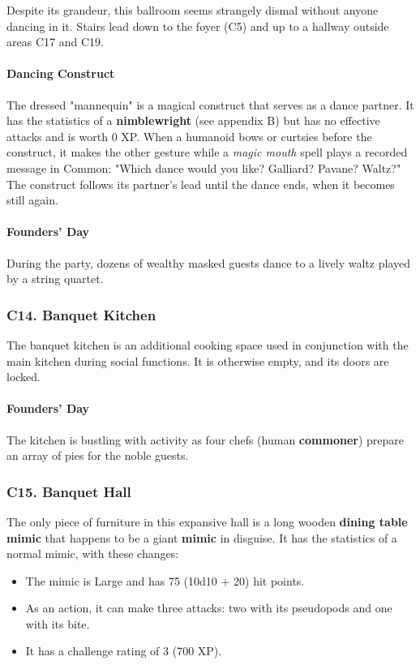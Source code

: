 \documentclass[10pt,a4paper,twoside,twocolumn,openany,nodeprecatedcode]{dndbook}
\begin{document}
Despite its grandeur, this ballroom seems strangely dismal without anyone dancing in it. Stairs lead down to the foyer (C5) and up to a hallway outside areas C17 and C19.
\paragraph{Dancing Construct}
The dressed "mannequin" is a magical construct that serves as a dance partner. It has the statistics of a \textbf{nimblewright} (see appendix B) but has no effective attacks and is worth 0 XP. When a humanoid bows or curtsies before the construct, it makes the other gesture while a \textit{magic mouth} spell plays a recorded message in Common: "Which dance would you like? Galliard? Pavane? Waltz?" The construct follows its partner's lead until the dance ends, when it becomes still again.
\paragraph{Founders' Day}
During the party, dozens of wealthy masked guests dance to a lively waltz played by a string quartet.
\subsubsection{C14. Banquet Kitchen}
The banquet kitchen is an additional cooking space used in conjunction with the main kitchen during social functions. It is otherwise empty, and its doors are locked.
\paragraph{Founders' Day}
The kitchen is bustling with activity as four chefs (human \textbf{commoner}) prepare an array of pies for the noble guests.
\subsubsection{C15. Banquet Hall}
The only piece of furniture in this expansive hall is a long wooden \textbf{dining table mimic} that happens to be a giant \textbf{mimic} in disguise. It has the statistics of a normal mimic, with these changes:
\begin{itemize}

\item The mimic is Large and has 75 (10d10 + 20) hit points.
\item As an action, it can make three attacks: two with its pseudopods and one with its bite.
\item It has a challenge rating of 3 (700 XP).
\end{itemize}
\end{document}
